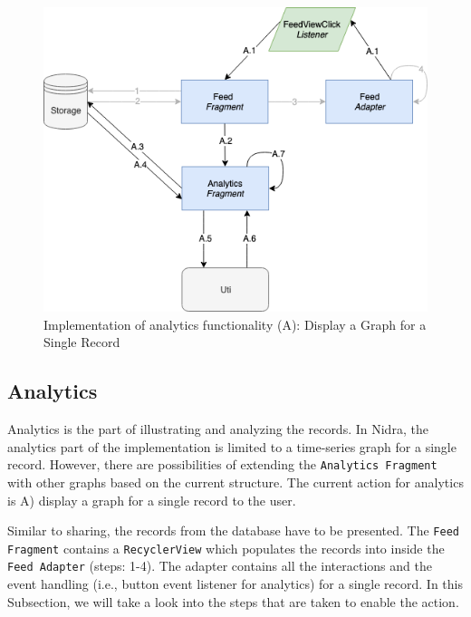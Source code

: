 

\begin{figure}
    \centering
    \includegraphics[scale=0.6]{images/Anal_Imp.png}
    \caption{Implementation of analytics functionality (A): Display a Graph for a Single Record}
    \label{fig:impl_analytics}
\end{figure}

\subsection{Analytics}
Analytics is the part of illustrating and analyzing the records. In Nidra, the analytics part of the implementation is limited to a time-series graph for a single record. However, there are possibilities of extending the \verb|Analytics Fragment| with other graphs based on the current structure. The current action for analytics is A) display a graph for a single record to the user. 

Similar to sharing, the records from the database have to be presented. The \verb|Feed Fragment| contains a \verb|RecyclerView| which populates the records into inside the \verb|Feed Adapter| (steps: 1-4). The adapter contains all the interactions and the event handling (i.e., button event listener for analytics) for a single record. In this Subsection, we will take a look into the steps that are taken to enable the action.

